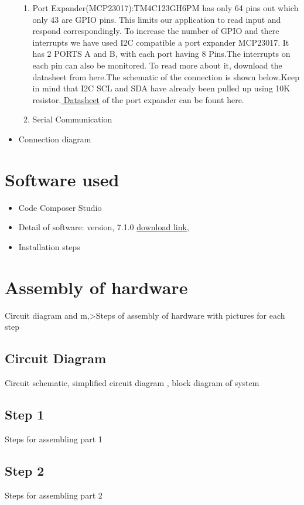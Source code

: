 \documentclass[a4paper,12pt,oneside]{book}
\begin{document}
\begin{itemize}
\begin{enumerate}
	\item Port Expander(MCP23017):TM4C123GH6PM has only 64 pins out which only 43 are GPIO pins. This limits our application to read input and respond correspondingly. To increase the number of GPIO and there interrupts we have
	used I2C compatible a port expander MCP23017. It has 2 PORTS A and B, with each port having 8
	Pins.The interrupts on each pin can also be monitored. To read more about it, download the datasheet
	from here.The schematic of the connection is shown below.Keep in mind that I2C SCL and SDA have
	already been pulled up using 10K resistor.\href{./datasheet/MCP23017.pdf}{ Datasheet} of the port expander can be fount here. 
	\item Serial Communication
	\end{enumerate} %
  \item Connection diagram
\end{itemize}

\section{Software used}
\begin{itemize}
  \item Code Composer Studio
  \item Detail of software: version, 7.1.0  \href{http://processors.wiki.ti.com/index.php/Download_CCS}{download link}, 
  \item Installation steps
\end{itemize}

\section{Assembly of hardware}
Circuit diagram and 
m,>Steps of assembly of hardware with pictures for each step
\subsection*{Circuit Diagram}
Circuit schematic, simplified circuit diagram , block diagram of system
\subsection*{Step 1}
Steps for assembling part 1
\subsection*{Step 2}
Steps for assembling part 2
\end{document}
